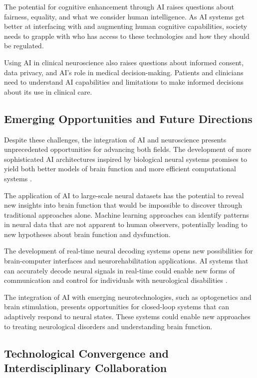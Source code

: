 \documentclass[conference]{IEEEtran}
\begin{document}
The potential for cognitive enhancement through AI raises questions about fairness, equality, and what we consider human intelligence. As AI systems get better at interfacing with and augmenting human cognitive capabilities, society needs to grapple with who has access to these technologies and how they should be regulated.

Using AI in clinical neuroscience also raises questions about informed consent, data privacy, and AI's role in medical decision-making. Patients and clinicians need to understand AI capabilities and limitations to make informed decisions about its use in clinical care.

\subsection{Emerging Opportunities and Future Directions}

Despite these challenges, the integration of AI and neuroscience presents unprecedented opportunities for advancing both fields. The development of more sophisticated AI architectures inspired by biological neural systems promises to yield both better models of brain function and more efficient computational systems \citep{schmidgallBraininspiredLearningArtificial2024}.

The application of AI to large-scale neural datasets has the potential to reveal new insights into brain function that would be impossible to discover through traditional approaches alone. Machine learning approaches can identify patterns in neural data that are not apparent to human observers, potentially leading to new hypotheses about brain function and dysfunction.

The development of real-time neural decoding systems opens new possibilities for brain-computer interfaces and neurorehabilitation applications. AI systems that can accurately decode neural signals in real-time could enable new forms of communication and control for individuals with neurological disabilities \citep{zhangBrainComputerInterfaces2024}.

The integration of AI with emerging neurotechnologies, such as optogenetics and brain stimulation, presents opportunities for closed-loop systems that can adaptively respond to neural states. These systems could enable new approaches to treating neurological disorders and understanding brain function.

\subsection{Technological Convergence and Interdisciplinary Collaboration}
\end{document}
